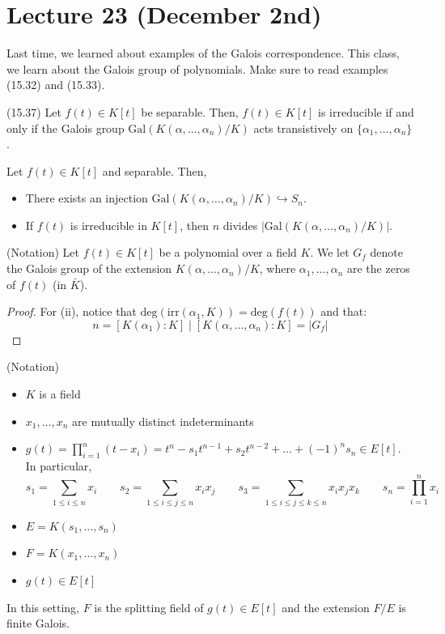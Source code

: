 \section{Lecture 23 (December 2nd)}
\begin{rmk}
Last time, we learned about examples of the Galois correspondence. This class, we learn about the Galois group of polynomials. Make sure to read examples (15.32) and (15.33). 
\end{rmk}
\vspace{2ex}
\begin{lem}
(15.37) Let $f(t)\in K[t]$ be separable. Then, $f(t)\in K[t]$ is irreducible if and only if the Galois group $\mathrm{Gal}(K(\alpha ,\ldots ,\alpha _{n})/K)$ acts transistively on $\{\alpha_1,\ldots ,\alpha _{n}\}$.
\end{lem}
\vspace{2ex}
\begin{lem}
Let $f(t)\in K[t]$ and separable. Then,
\begin{itemize}
\item[(i)] There exists an injection $\mathrm{Gal}(K(\alpha ,\ldots ,\alpha _{n})/K)\hookrightarrow S_{n}$. 
\item[(ii)] If $f(t)$ is irreducible in $K[t]$, then $n$ divides $|\mathrm{Gal}(K(\alpha ,\ldots ,\alpha _{n})/K)|$. 
\end{itemize}
\end{lem}
\vspace{2ex}
\begin{rmk}
(Notation) Let $f(t)\in K[t]$ be a polynomial over a field $K$. We let $G_{f}$ denote the Galois group of the extension $K(\alpha ,\ldots ,\alpha _{n})/K$, where $\alpha_1,\ldots ,\alpha _{n}$ are the zeros of $f(t)$ (in $\bar{K}$). 
\end{rmk}
\vspace{2ex}
\begin{proof}
For (ii), notice that $\mathrm{deg}(\mathrm{irr}(\alpha_1,K))=\mathrm{deg}(f(t))$ and that:
\[n=[K(\alpha_1):K]\;|\;[K(\alpha,\ldots ,\alpha _{n}):K]=|G_{f}|\]
\end{proof}
\vspace{2ex}
\begin{rmk}
(Notation) 
\begin{itemize}
\item[(i)] $K$ is a field
\item[(ii)] $x_1,\ldots ,x_{n}$ are mutually distinct indeterminants
\item[(iii)] $g(t)=\prod^{n}_{i=1}(t-x_{i})=t^{n}-s_1t^{n-1}+s_2t^{n-2}+\ldots +(-1)^{n}s_{n}\in E[t]$. In particular,
\[s_1=\sum _{1\leq i\leq n}x_{i}\qquad s_2=\sum _{1\leq i\leq j\leq n}x_{i}x_{j}\qquad s_3=\sum _{1\leq i\leq j\leq k\leq n}x_ix_{j}x_{k}\qquad s_{n}=\prod^{n}_{i=1}x_{i}\]
\item[(iv)] $E=K(s_1,\ldots ,s_{n})$
\item[(v)] $F=K(x_1,\ldots ,x_{n})$
\item[(vi)] $g(t)\in E[t]$ 
\end{itemize}
In this setting, $F$ is the splitting field of $g(t)\in E[t]$ and the extension $F/E$ is finite Galois.
\end{rmk}
